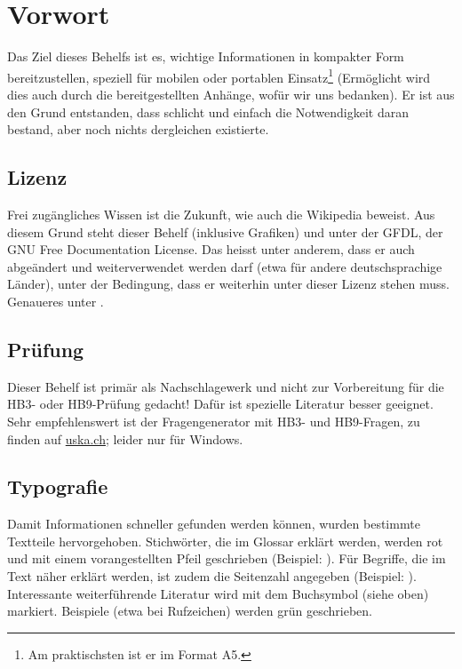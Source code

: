 \chapter{Vorwort}
Das Ziel dieses Behelfs ist es, wichtige Informationen in kompakter Form bereitzustellen, speziell für mobilen oder portablen Einsatz\footnote{Am praktischsten ist er im Format A5.} (Ermöglicht wird dies auch durch die bereitgestellten Anhänge, wofür wir uns bedanken). Er ist aus den Grund entstanden, dass schlicht und einfach die Notwendigkeit daran bestand, aber noch nichts dergleichen existierte.

\section{Lizenz}
Frei zugängliches Wissen ist die Zukunft, wie auch die Wikipedia beweist. Aus diesem Grund steht dieser Behelf (inklusive Grafiken) und unter der GFDL, der GNU Free Documentation License. Das heisst unter anderem, dass er auch abgeändert und weiterverwendet werden darf (etwa für andere deutschsprachige Länder), unter der Bedingung, dass er weiterhin unter dieser Lizenz stehen muss. Genaueres unter .

\section{Prüfung}

Dieser Behelf ist primär als Nachschlagewerk und nicht zur Vorbereitung für die HB3- oder HB9-Prüfung gedacht! Dafür ist spezielle Literatur besser geeignet. Sehr empfehlenswert ist der Fragengenerator mit HB3- und HB9-Fragen, zu finden auf \href{http://www.uska.ch}{uska.ch}; leider nur für Windows.

\section{Typografie}

Damit Informationen schneller gefunden werden können, wurden bestimmte Textteile hervorgehoben. Stichwörter, die im Glossar erklärt werden, werden rot und mit einem vorangestellten Pfeil geschrieben (Beispiel: ). Für Begriffe, die im Text näher erklärt werden, ist zudem die Seitenzahl angegeben (Beispiel: ). Interessante weiterführende Literatur wird mit dem Buchsymbol (siehe oben) markiert. Beispiele (etwa bei Rufzeichen) werden grün geschrieben.

